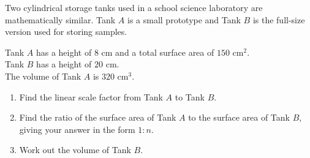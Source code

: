 \begin{question}
\noindent Two cylindrical storage tanks used in a school science laboratory are mathematically similar. Tank $A$ is a small prototype and Tank $B$ is the full-size version used for storing samples.

\begin{center}
\end{center}

\noindent Tank $A$ has a height of $8$ cm and a total surface area of $150$ cm$^2$.\\
Tank $B$ has a height of $20$ cm.\\
The volume of Tank $A$ is $320$ cm$^3$.

\begin{enumerate}
    \item[(a)] Find the linear scale factor from Tank $A$ to Tank $B$.

    \vspace{2.5cm}

    \item[(b)] Find the ratio of the surface area of Tank $A$ to the surface area of Tank $B$, giving your answer in the form $1 : n$.

    \vspace{3cm}

    \item[(c)] Work out the volume of Tank $B$.

    \vspace{4cm}
\end{enumerate}
\end{question}
